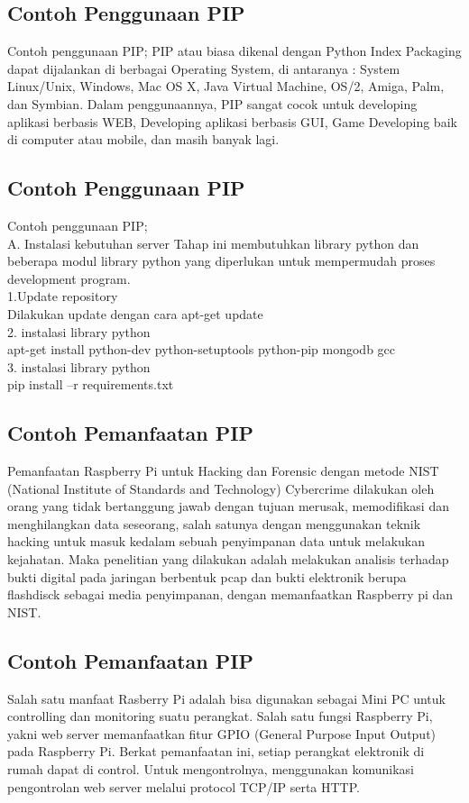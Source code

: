 \subsection{Contoh Penggunaan PIP}
Contoh penggunaan PIP;
PIP atau biasa dikenal dengan Python Index Packaging dapat dijalankan di berbagai Operating System, di antaranya : System Linux/Unix, Windows, Mac OS X, Java Virtual Machine, OS/2, Amiga, Palm, dan Symbian. Dalam penggunaannya, PIP sangat cocok untuk developing aplikasi berbasis WEB, Developing aplikasi berbasis GUI, Game Developing baik di computer atau mobile, dan masih banyak lagi.
\subsection{Contoh Penggunaan PIP}
Contoh penggunaan PIP;\\
A. Instalasi kebutuhan server
Tahap ini membutuhkan library python dan beberapa modul library python yang diperlukan untuk mempermudah proses development program.\\
1.Update repository\\
Dilakukan update dengan cara apt-get update\\
2. instalasi library python\\
apt-get install python-dev python-setuptools python-pip mongodb gcc\\
3. instalasi library python\\
pip install –r requirements.txt
\subsection{Contoh Pemanfaatan PIP}
Pemanfaatan Raspberry Pi untuk Hacking dan Forensic dengan metode NIST (National Institute of Standards and Technology)
Cybercrime dilakukan oleh orang yang tidak bertanggung jawab dengan tujuan merusak, memodifikasi dan menghilangkan data seseorang, salah satunya dengan menggunakan teknik hacking untuk masuk kedalam sebuah penyimpanan data untuk melakukan kejahatan.  Maka penelitian yang dilakukan adalah melakukan analisis terhadap bukti digital pada jaringan berbentuk pcap dan bukti elektronik berupa flashdisck sebagai media penyimpanan, dengan memanfaatkan Raspberry pi dan NIST.
\subsection{Contoh Pemanfaatan PIP}
Salah satu manfaat Rasberry Pi adalah bisa digunakan sebagai Mini PC untuk controlling dan monitoring suatu perangkat. Salah satu fungsi Raspberry Pi, yakni web server memanfaatkan fitur GPIO (General Purpose Input Output) pada Raspberry Pi. Berkat pemanfaatan ini, setiap perangkat elektronik di rumah dapat di control. Untuk mengontrolnya, menggunakan komunikasi pengontrolan web server melalui protocol TCP/IP serta HTTP.
